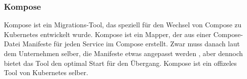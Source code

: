 \subsubsection{Kompose}

Kompose ist ein Migrations-Tool, das speziell für den Wechsel von Compose zu Kubernetes entwickelt wurde. 
Kompose ist ein Mapper, der aus einer Compose-Datei Manifeste für jeden Service im Compose erstellt.
Zwar muss danach laut dem Unternehmen selber, die Manifeste etwas angepasst werden \parencite{kompose2026}, aber dennoch bietet das Tool den optimal Start für den Übergang.
Kompose ist ein offizeles Tool von Kubernetes selber.